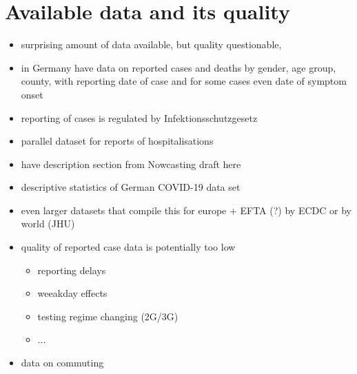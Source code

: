 \section{Available data and its quality}
\label{sec:data}

\begin{itemize}
    \item surprising amount of data available, but quality questionable, 
    \item in Germany have data on reported cases and deaths by gender, age group, county, with reporting date of case and for some cases even date of symptom onset
    \item reporting of cases is regulated by Infektionsschutzgesetz
    \item parallel dataset for reports of hospitalisations 
    \item have description section from Nowcasting draft here
    \item descriptive statistics of German COVID-19 data set
    \item even larger datasets that compile this for europe + EFTA (?) by ECDC or by world (JHU)
    \item quality of reported case data is potentially too low 
    \begin{itemize}
        \item reporting delays
        \item weeakday effects
        \item testing regime changing (2G/3G)
        \item ...
    \end{itemize}
    \item data on commuting
\end{itemize}